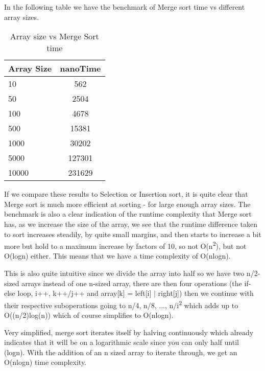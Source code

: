 \documentclass[a4paper,11pt]{article}
\begin{document}
In the following table we have the benchmark of Merge sort time vs different array sizes.
\begin{table}[h]
\begin{center}
\begin{tabular}{l|c}
\textbf{Array Size} & \textbf{nanoTime}\\
\hline
  10      &  562    \\
  50     &  2504   \\
  100    &  4678   \\
  500   &  15381  \\
  1000  &  30202 \\
  5000      &  127301    \\
  10000     &  231629   \\

\end{tabular}
\caption{Array size vs Merge Sort time}
\label{tab:table3}
\end{center}
\end{table}

If we compare these results to Selection or Insertion sort, it is quite clear that Merge sort is much more efficient at sorting - for large enough array sizes. The benchmark is also a clear indication of the runtime complexity that Merge sort has, as we increase the size of the array, we see that the runtime difference taken to sort increases steadily, by quite small margins, and then starts to increase a bit more but hold to a maximum increase by factors of 10, so not O(n\textsuperscript{2}), but not O(logn) either. This means that we have a time complexity of O(nlogn).

This is also quite intuitive since we divide the array into half so we have two n/2-sized arrays instead of one n-sized array, there are then four operations (the if-else loop, i++, k++/j++ and array[k] = left[i] $|$ right[j]) then we continue with their respective suboperations going to n/4, n/8, ..., n/i\textsuperscript{2} which adds up to  O((n/2)log(n)) which of course simplifies to O(nlogn). 

Very simplified, merge sort iterates itself by halving continuously which already indicates that it will be on a logarithmic scale since you can only half until (logn). With the addition of an n sized array to iterate through, we get an O(nlogn) time complexity.
\end{document}
